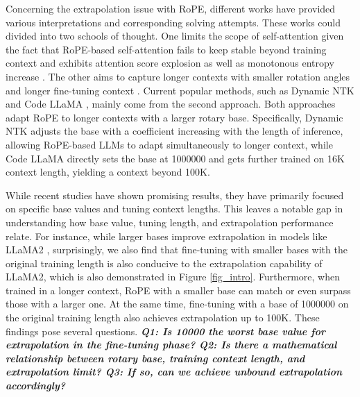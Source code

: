 Concerning the extrapolation issue with RoPE, different works have provided various interpretations and corresponding solving attempts. These works could divided into two schools of thought. One limits the scope of self-attention \citep{ratner2022parallel,han2023lm} given the fact that RoPE-based self-attention fails to keep stable beyond training context and exhibits attention score explosion as well as monotonous entropy increase \citep{chen2023extending,han2023lm}. The other aims to capture longer contexts with smaller rotation angles and longer fine-tuning context \citep{chen2023extending,peng2023yarn}. Current popular methods, such as Dynamic NTK \citep{dynamicNTK} and Code LLaMA \citep{roziere2023code}, mainly come from the second approach. Both approaches adapt RoPE to longer contexts with a larger rotary base. Specifically, Dynamic NTK \citep{dynamicNTK} adjusts the base with a coefficient increasing with the length of inference, allowing RoPE-based LLMs to adapt simultaneously to longer context, while Code LLaMA \citep{roziere2023code} directly sets the base at 1000000 and gets further trained on 16K context length, yielding a context beyond 100K.

While recent studies have shown promising results, they have primarily focused on specific base values and tuning context lengths. This leaves a notable gap in understanding how base value, tuning length, and extrapolation performance relate. For instance, while larger bases improve extrapolation in models like LLaMA2 \citep{touvron2023llama}, surprisingly, we also find that fine-tuning with smaller bases with the original training length is also conducive to the extrapolation capability of LLaMA2, which is also demonstrated in Figure \ref{fig_intro}. Furthermore, when trained in a longer context, RoPE with a smaller base can match or even surpass those with a larger one. At the same time, fine-tuning with a base of 1000000 on the original training length also achieves extrapolation up to 100K. These findings pose several questions. \textbf{\textit{Q1: Is 10000 the worst base value for extrapolation in the fine-tuning phase? Q2: Is there a mathematical relationship between rotary base, training context length, and extrapolation limit? Q3: If so, can we achieve unbound extrapolation accordingly?}}


